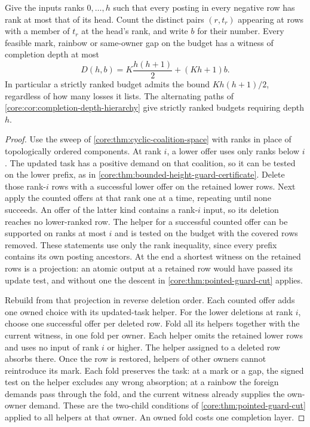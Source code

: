 \begin{theorem}
\label{core:thm:ranked-completion-depth}
Give the inputs ranks $0,\ldots,h$ such that every posting in every
negative row has rank at most that of its head. Count the distinct
pairs $(r,t_r)$ appearing at rows with a member of $t_r$ at the head's
rank, and write $b$ for their number. Every feasible mark, rainbow or
same-owner gap on the budget has a witness of completion depth at most
\[
 D(h,b)=K\frac{h(h+1)}2+(Kh+1)b.
\]
In particular a strictly ranked budget admits the bound
$Kh(h+1)/2$, regardless of how many losses it lists. The alternating
paths of \cref{core:cor:completion-depth-hierarchy} give strictly ranked
budgets requiring depth $h$.
\end{theorem}
\begin{proof}
Use the sweep of \cref{core:thm:cyclic-coalition-space} with ranks in
place of topologically ordered components. At rank $i$, a lower offer
uses only ranks below $i$. The updated task has a positive demand on
that coalition, so it can be tested on the lower prefix, as in
\cref{core:thm:bounded-height-guard-certificate}. Delete those rank-$i$
rows with a successful lower offer on the retained lower rows. Next
apply the counted offers at that rank one at a time, repeating until
none succeeds. An offer of the latter kind contains a rank-$i$ input,
so its deletion reaches no lower-ranked row. The helper for a successful
counted offer can be supported on ranks at most $i$ and is tested on
the budget with the covered rows removed. These statements use only the
rank inequality, since every prefix contains its own posting ancestors.
At the end a shortest witness on the retained rows is a projection:
an atomic output at a retained row would have passed its update test,
and without one the descent in \cref{core:thm:pointed-guard-cut} applies.

Rebuild from that projection in reverse deletion order. Each counted
offer adds one owned choice with its updated-task helper. For the lower
deletions at rank $i$, choose one successful offer per deleted row.
Fold all its helpers together with the current witness, in one fold
per owner. Each helper omits the retained lower rows and uses no input
of rank $i$ or higher. The helper assigned to a deleted row absorbs
there. Once the row is restored, helpers of other owners cannot
reintroduce its mark. Each fold preserves the task: at a mark or a
gap, the signed test on the helper excludes any wrong absorption;
at a rainbow the foreign demands pass through the fold, and the
current witness already supplies the own-owner demand. These are the
two-child conditions of \cref{core:thm:pointed-guard-cut} applied to all
helpers at that owner. An owned fold costs one completion layer.


\end{proof}
